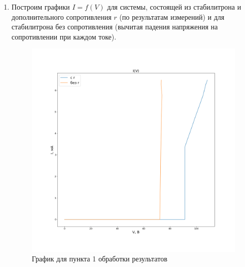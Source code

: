 \documentclass[a4paper, 12pt]{article}
\begin{document}
    \begin{enumerate}
        \item Построим графики $I = f\left(V\right)$ для системы, состоящей из стабилитрона и дополнительного сопротивления $r$ (по результатам измерений) и для стабилитрона без сопротивления (вычитая падения напряжения на сопротивлении при каждом токе).
        
        \begin{figure}[!h]
            \begin{center}
                \includegraphics[scale=0.4]{graph1.png}
                \caption{График для пункта 1 обработки результатов}
            \end{center}
        \end{figure}


\end{enumerate}
\end{document}
